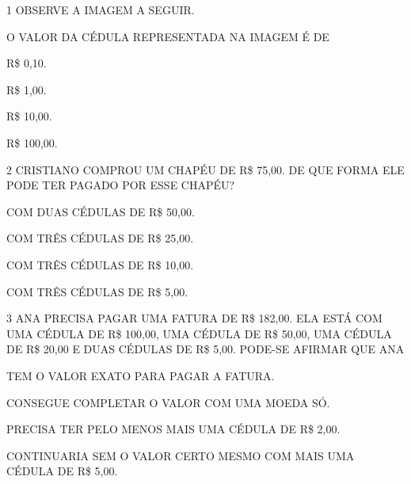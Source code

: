 \num{1} OBSERVE A IMAGEM A SEGUIR.


O VALOR DA CÉDULA REPRESENTADA NA IMAGEM É DE


\begin{escolha}
\item R\$ 0,10.

\item R\$ 1,00.

\item R\$ 10,00.

\item R\$ 100,00.
\end{escolha}


\num{2} CRISTIANO COMPROU UM CHAPÉU DE R\$ 75,00. DE QUE FORMA ELE PODE TER PAGADO POR ESSE CHAPÉU?

\begin{escolha}
\item COM DUAS CÉDULAS DE R\$ 50,00.

\item COM TRÊS CÉDULAS DE R\$ 25,00.

\item COM TRÊS CÉDULAS DE R\$ 10,00.

\item COM TRÊS CÉDULAS DE R\$ 5,00.
\end{escolha}




\num{3} ANA PRECISA PAGAR UMA FATURA DE R\$ 182,00. ELA ESTÁ COM UMA CÉDULA DE R\$ 100,00, UMA CÉDULA DE R\$ 50,00, UMA CÉDULA DE R\$ 20,00 E DUAS CÉDULAS DE R\$ 5,00. PODE-SE AFIRMAR QUE ANA

\begin{escolha}
\item TEM O VALOR EXATO PARA PAGAR A FATURA.

\item CONSEGUE COMPLETAR O VALOR COM UMA MOEDA SÓ.

\item PRECISA TER PELO MENOS MAIS UMA CÉDULA DE R\$ 2,00.

\item CONTINUARIA SEM O VALOR CERTO MESMO COM MAIS UMA CÉDULA DE R\$ 5,00.
\end{escolha}

